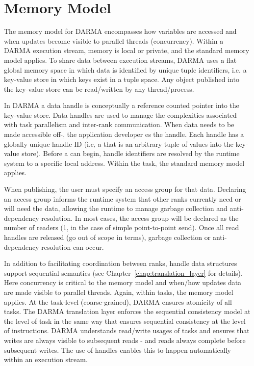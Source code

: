 
\section{Memory Model}
\label{sec:mem_model}
The memory model for \gls{DARMA} encompasses how variables are accessed %
  and when updates become visible to parallel threads (concurrency).  
Within a \gls{DARMA} \gls{execution stream}, memory is local or private, and the
standard \CC{} memory model applies. 
To share data between \glspl{execution stream}, \gls{DARMA} uses a flat global
\gls{memory space} in which data is identified by unique \gls{tuple} identifiers, i.e. a \gls{key-value
  store} in which keys exist in a \gls{tuple space}.
Any object published into the \gls{key-value store} can be read/written by any thread/process. 

In \gls{DARMA} a data \gls{handle} is conceptually a \gls{reference counted pointer} into the
\gls{key-value store}.  Data \glspl{handle} are used to manage the
complexities associated with \gls{task parallelism} and inter-\gls{rank} communication.  
When data needs to be made accessible off-, the application developer 
es the \gls{handle}.  Each \gls{handle} has a globally unique handle ID
(i.e, a  that is an arbitrary \gls{tuple} of values into the
 \gls{key-value store}).  
Before a  can begin, \gls{handle} identifiers are resolved by
the \gls{runtime system} to a specific local address. Within the task, the standard \CC{} memory model applies.

When publishing, the user must specify an \gls{access group} for that data.  
Declaring an \gls{access group} informs the \gls{runtime system} that other
\glspl{rank} currently need or will need the data,  
allowing the runtime to manage garbage collection and \gls{anti-dependency} resolution.
In most cases, the \gls{access group} will be declared as the number of readers (1, in the case of simple point-to-point send).
Once all read \glspl{handle} are released (go out of scope in \CC{} terms),
garbage collection or \gls{anti-dependency} resolution can occur.


In addition to facilitating coordination between \glspl{rank}, \gls{handle} data
structures support \gls{sequential semantics} (see
Chapter~\ref{chap:translation_layer} for details).
Here concurrency is critical to the \gls{memory model} and when/how updates data
are made visible to parallel threads.
Again, within \glspl{task}, the \CC{} \gls{memory model} applies.
At the \gls{task}-level (coarse-grained), \gls{DARMA} ensures atomicity of all
\glspl{task}.
The \gls{DARMA} translation layer enforces the \CC{} sequential consistency
model at the level of \gls{task} in the same way that \CC{} ensures sequential
consistency at the level of instructions.
\gls{DARMA} understands read/write usages of \glspl{task} and ensures that
writes are always visible to subsequent reads - and reads always complete before
subsequent writes.
The use of \glspl{handle} enables this to happen automatically within an
\gls{execution stream}.




